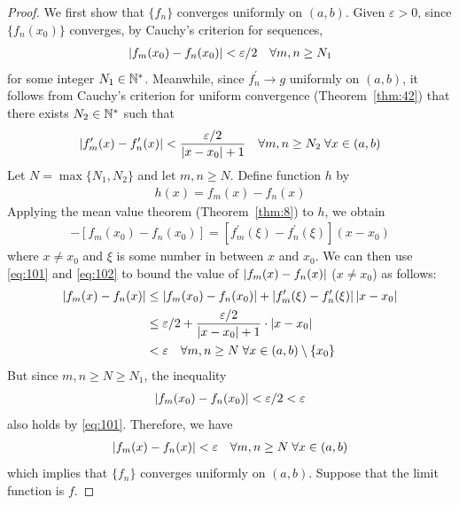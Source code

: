 \documentclass[thmcnt=section, 12pt]{my-elegantbook}
\begin{document}
\begin{proof}
    We first show that $\{f_n\}$ converges uniformly on $(a, b)$. Given $\varepsilon > 0$, since $\{f_n(x_0)\}$ converges, by Cauchy's criterion for sequences,
    \begin{align}
        \left\lvert f_m(x_0) - f_n(x_0) \right\rvert < \varepsilon / 2
        \quad \forall m,n \geq N_1
        \label{eq:101}
    \end{align}
    for some integer $N_1 \in \mathbb{N}^\ast$. Meanwhile, since $f^\prime_n \to g$ uniformly on $(a, b)$, it follows from Cauchy's criterion for uniform convergence (Theorem~\ref{thm:42}) that there exists $N_2 \in \mathbb{N}^\ast$ such that
    \begin{align}
        \left\lvert f^\prime_m(x) - f^\prime_n(x) \right\rvert < \frac{\varepsilon / 2}{\left\lvert x - x_0 \right\rvert + 1}
        \quad \forall m, n \geq N_2 \;
        \forall x \in (a, b)
        \label{eq:102}
    \end{align}
    Let $N = \max\{N_1, N_2\}$ and let $m, n \geq N$. Define function $h$ by
    \begin{align*}
        h(x) = f_m(x) - f_n(x)
    \end{align*}
    Applying the mean value theorem (Theorem~\ref{thm:8}) to $h$, we obtain
    \begin{align*}
        [f_m(x) - f_n(x)] - [f_m(x_0) - f_n(x_0)]
        = [f^\prime_m(\xi) - f^\prime_n(\xi)] (x - x_0)
    \end{align*}
    where $x \neq x_0$ and $\xi$ is some number in between $x$ and $x_0$. We can then use \eqref{eq:101} and \eqref{eq:102} to bound the value of $\left\lvert f_m(x) - f_n(x) \right\rvert$ ($x \neq x_0$) as follows:
    \begin{align*}
        \left\lvert f_m(x) - f_n(x) \right\rvert
         & \leq \left\lvert f_m(x_0) - f_n(x_0) \right\rvert
        + \left\lvert f^\prime_m(\xi) - f^\prime_n(\xi) \right\rvert \left\lvert x - x_0 \right\rvert                                 \\
         & \leq \varepsilon / 2 + \frac{\varepsilon / 2}{\left\lvert x - x_0 \right\rvert + 1} \cdot \left\lvert x - x_0 \right\rvert \\
         & < \varepsilon
        \quad \forall m,n \geq N \;
        \forall x \in (a, b) \setminus \{x_0\}
    \end{align*}
    But since $m,n \geq N \geq N_1$, the inequality
    \begin{align*}
        \left\lvert f_m(x_0) - f_n(x_0) \right\rvert < \varepsilon / 2 < \varepsilon
    \end{align*}
    also holds by \eqref{eq:101}. Therefore, we have
    \begin{align*}
        \left\lvert f_m(x) - f_n(x) \right\rvert
        < \varepsilon
        \quad \forall m,n \geq N \;
        \forall x \in (a, b)
    \end{align*}
    which implies that $\{f_n\}$ converges uniformly on $(a, b)$. Suppose that the limit function is $f$.


\end{proof}
\end{document}
